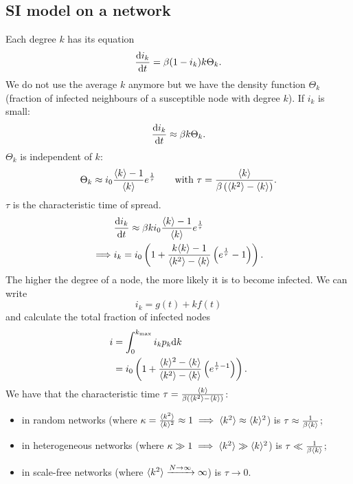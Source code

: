 \documentclass[a4paper,9pt]{extarticle}
\begin{document}
\begin{multicols*}{2}
	\subsection{SI model on a network}
	Each degree $k$ has its equation
	\begin{equation*}
		\frac{\mathrm{d} i_{k}}{\mathrm{d} t}=\beta(1-i_{k})k\Theta_{k}.
	\end{equation*}
	We do not use the average $k$ anymore but we have the density function $\Theta_k$ (fraction of infected neighbours of a susceptible node with degree $k$). If $i_{k}$ is small:
	\begin{equation*}
		\frac{\mathrm{d} i_{k}}{\mathrm{d} t}\approx\beta k\Theta_{k}.
	\end{equation*}
	$\Theta_{k}$ is independent of $k$:
	\begin{equation*}
		\Theta_{k}\approx i_{0}\frac{\langle k \rangle-1}{\langle k \rangle}e^{\frac{1}{\tau}}\qquad\text{with }\tau=\frac{\langle k \rangle}{\beta\left(\langle k^{2} \rangle-\langle k \rangle\right)}.
	\end{equation*}
	$\tau$ is the characteristic time of spread. 
	\begin{align*}
		&\frac{\mathrm{d} i_{k}}{\mathrm{d} t}\approx\beta ki_{0}\frac{\langle k \rangle-1}{\langle k \rangle}e^{\frac{1}{\tau}}\\
		\implies&i_{k}=i_{0}\left(1+\frac{k\langle k \rangle-1}{\langle k^{2} \rangle-\langle k \rangle}\left(e^{\frac{1}{\tau}}-1\right)\right).
	\end{align*}
	The higher the degree of a node, the more likely it is to become infected. We can write
	\begin{equation*}
		i_{k}=g(t)+kf(t)
	\end{equation*}
	and calculate the total fraction of infected nodes
	\begin{align*}
		i&=\int_{0}^{k_{\max}}i_{k}p_{k}\mathrm{d} k\\
		&=i_{0}\left(1+\frac{\langle k \rangle^{2}-\langle k \rangle}{\langle k^{2} \rangle-\langle k \rangle}\left(e^{\frac{1}{\tau}-1}\right)\right).
	\end{align*}
	We have that the characteristic time $\tau=\frac{\langle k \rangle}{\beta\left(\langle k^{2} \rangle-\langle k \rangle\right)}$:
	\begin{itemize}
		\item in random networks (where $\kappa=\frac{\langle k^{2} \rangle}{\langle k \rangle^{2}}\approx 1\implies\langle k^{2} \rangle\approx\langle k \rangle^{2}$) is $\tau\approx\frac{1}{\beta\langle k \rangle}$;
		\item in heterogeneous networks (where $\kappa\gg1\implies\langle k^{2} \rangle\gg\langle k \rangle^{2}$) is $\tau\ll\frac{1}{\beta\langle k \rangle}$;
		\item in scale-free networks (where $\langle k^{2} \rangle\xrightarrow{N\to\infty}\infty$) is $\tau\to0$.
	\end{itemize}

\end{multicols*}
\end{document}
